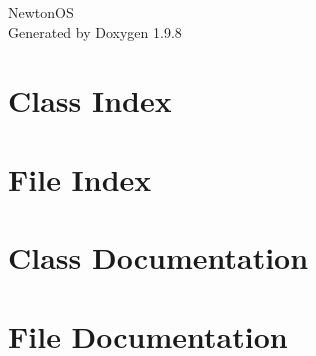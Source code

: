 \documentclass[twoside]{book}
\newcommand{\+}{\discretionary{\mbox{\scriptsize$\hookleftarrow$}}{}{}}
\newcommand{\clearemptydoublepage}{%
    \newpage{\pagestyle{empty}\cleardoublepage}%
  }
\begin{document}
  \raggedbottom
    \hypersetup{pageanchor=false,
                bookmarksnumbered=true,
                pdfencoding=unicode
               }
  \begin{titlepage}
  \vspace*{7cm}
  \begin{center}%
  {\Large Newton\+OS}\\
  \vspace*{1cm}
  {\large Generated by Doxygen 1.9.8}\\
  \end{center}
  \end{titlepage}
  \clearemptydoublepage
  \tableofcontents
  \clearemptydoublepage
  \hypersetup{pageanchor=true}
\chapter{Class Index}

\chapter{File Index}

\chapter{Class Documentation}










\chapter{File Documentation}













  \backmatter
  \newpage
  \clearemptydoublepage
  \printindex
\end{document}
